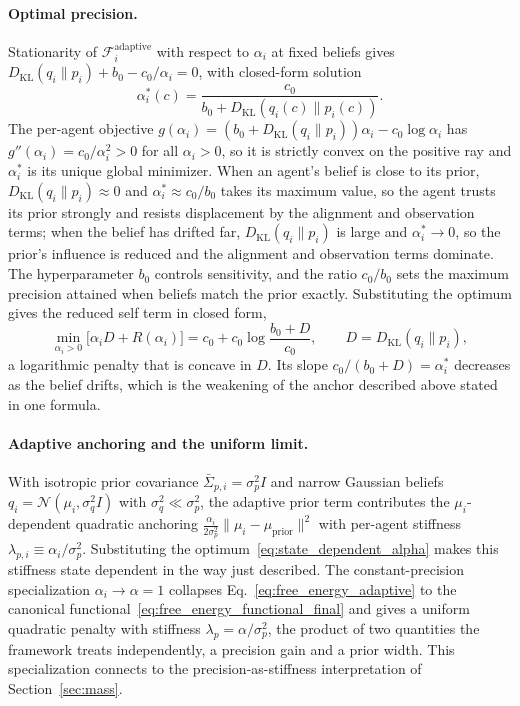 \documentclass[11pt]{article}
\begin{document}
\paragraph{Optimal precision.}
Stationarity of $\mathcal{F}_i^{\mathrm{adaptive}}$ with respect to $\alpha_i$ at fixed beliefs gives $D_{\mathrm{KL}}(q_i\|p_i) + b_0 - c_0/\alpha_i = 0$, with closed-form solution
\begin{equation}
\boxed{
\alpha_i^*(c) = \frac{c_0}{b_0 + D_{\mathrm{KL}}(q_i(c)\|p_i(c))}.
}
\label{eq:state_dependent_alpha}
\end{equation}
The per-agent objective $g(\alpha_i) = (b_0 + D_{\mathrm{KL}}(q_i\|p_i))\alpha_i - c_0\log\alpha_i$ has $g''(\alpha_i) = c_0/\alpha_i^2 > 0$ for all $\alpha_i > 0$, so it is strictly convex on the positive ray and $\alpha_i^*$ is its unique global minimizer. When an agent's belief is close to its prior, $D_{\mathrm{KL}}(q_i\|p_i) \approx 0$ and $\alpha_i^* \approx c_0/b_0$ takes its maximum value, so the agent trusts its prior strongly and resists displacement by the alignment and observation terms; when the belief has drifted far, $D_{\mathrm{KL}}(q_i\|p_i)$ is large and $\alpha_i^* \to 0$, so the prior's influence is reduced and the alignment and observation terms dominate. The hyperparameter $b_0$ controls sensitivity, and the ratio $c_0/b_0$ sets the maximum precision attained when beliefs match the prior exactly. Substituting the optimum gives the reduced self term in closed form,
\begin{equation}
\min_{\alpha_i>0}\big[\alpha_i D + R(\alpha_i)\big] = c_0 + c_0\log\frac{b_0 + D}{c_0},
\qquad D = D_{\mathrm{KL}}(q_i\|p_i),
\end{equation}
a logarithmic penalty that is concave in $D$. Its slope $c_0/(b_0+D)=\alpha_i^*$ decreases as the belief drifts, which is the weakening of the anchor described above stated in one formula.

\paragraph{Adaptive anchoring and the uniform limit.}
With isotropic prior covariance $\bar\Sigma_{p,i} = \sigma_p^2 I$ and narrow Gaussian beliefs $q_i = \mathcal{N}(\mu_i, \sigma_q^2 I)$ with $\sigma_q^2 \ll \sigma_p^2$, the adaptive prior term contributes the $\mu_i$-dependent quadratic anchoring $\frac{\alpha_i}{2\sigma_p^2}\|\mu_i - \mu_{\mathrm{prior}}\|^2$ with per-agent stiffness $\lambda_{p,i} \equiv \alpha_i/\sigma_p^2$. Substituting the optimum~\eqref{eq:state_dependent_alpha} makes this stiffness state dependent in the way just described. The constant-precision specialization $\alpha_i \to \alpha = 1$ collapses Eq.~\eqref{eq:free_energy_adaptive} to the canonical functional~\eqref{eq:free_energy_functional_final} and gives a uniform quadratic penalty with stiffness $\lambda_p = \alpha/\sigma_p^2$, the product of two quantities the framework treats independently, a precision gain and a prior width. This specialization connects to the precision-as-stiffness interpretation of Section~\ref{sec:mass}.
\end{document}
